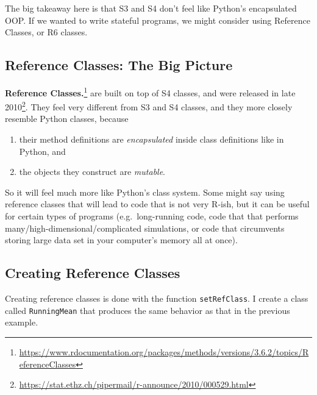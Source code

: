 \documentclass[
  12pt,
]{krantz}
\providecommand{\tightlist}{%
  \setlength{\itemsep}{0pt}\setlength{\parskip}{0pt}}
\renewcommand{\href}[2]{#2\footnote{\url{#1}}}
\begin{document}
The big takeaway here is that S3 and S4 don't feel like Python's encapsulated OOP. If we wanted to write stateful programs, we might consider using Reference Classes, or R6 classes.

\hypertarget{reference-classes-the-big-picture}{%
\subsection{Reference Classes: The Big Picture}\label{reference-classes-the-big-picture}}

\href{https://www.rdocumentation.org/packages/methods/versions/3.6.2/topics/ReferenceClasses}{\textbf{Reference Classes.}} are built on top of S4 classes, and were released in \href{https://stat.ethz.ch/pipermail/r-announce/2010/000529.html}{late 2010}. They feel very different from S3 and S4 classes, and they more closely resemble Python classes, because

\begin{enumerate}
\def\labelenumi{\arabic{enumi}.}
\tightlist
\item
  their method definitions are \emph{encapsulated} inside class definitions like in Python, and
\item
  the objects they construct are \emph{mutable}.
\end{enumerate}

So it will feel much more like Python's class system. Some might say using reference classes that will lead to code that is not very R-ish, but it can be useful for certain types of programs (e.g.~long-running code, code that that performs many/high-dimensional/complicated simulations, or code that circumvents storing large data set in your computer's memory all at once).

\hypertarget{creating-reference-classes}{%
\subsection{Creating Reference Classes}\label{creating-reference-classes}}

Creating reference classes is done with the function \texttt{setRefClass}. I create a class called \texttt{RunningMean} that produces the same behavior as that in the previous example.
\end{document}
